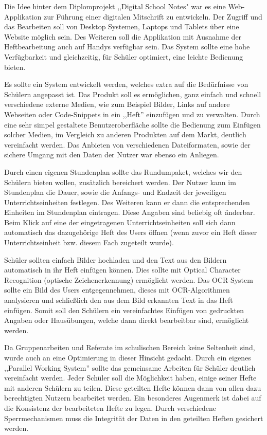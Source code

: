 Die Idee hinter dem Diplomprojekt ,,Digital School Notes" war es eine Web-Applikation zur Führung einer digitalen Mitschrift zu entwickeln. Der Zugriff und das Bearbeiten soll von Desktop Systemen, Laptops und Tablets über eine Website möglich sein. Des Weiteren soll die Applikation mit Ausnahme der Heftbearbeitung auch auf Handys verfügbar sein. Das System sollte eine hohe Verfügbarkeit und gleichzeitig, für Schüler optimiert, eine leichte Bedienung bieten. 

Es sollte ein System entwickelt werden, welches extra auf die Bedürfnisse von Schülern angepasst ist. Das Produkt soll es ermöglichen, ganz einfach und schnell verschiedene externe Medien, wie zum Beispiel Bilder, Links auf andere Webseiten oder Code-Snippets in ein ,,Heft'' einzufügen und zu verwalten. Durch eine sehr simpel gestaltete Benutzeroberfläche sollte die Bedienung zum Einfügen solcher Medien, im Vergleich zu anderen Produkten auf dem Markt, deutlich vereinfacht werden. Das Anbieten von verschiedenen Dateiformaten, sowie der sichere Umgang mit den Daten der Nutzer war ebenso ein Anliegen.

Durch einen eigenen Stundenplan sollte das Rundumpaket, welches wir den Schülern bieten wollen, zusätzlich bereichert werden. Der Nutzer kann im Stundenplan die Dauer, sowie die Anfangs- und Endzeit der jeweiligen Unterrichtseinheiten festlegen. Des Weiteren kann er dann die entsprechenden Einheiten im Stundenplan eintragen. Diese Angaben sind beliebig oft änderbar. Beim Klick auf eine der eingetragenen Unterrichtseinheiten soll sich dann automatisch das dazugehörige Heft des Users öffnen (wenn zuvor ein Heft dieser Unterrichtseinheit bzw. diesem Fach zugeteilt wurde).

Schüler sollten einfach Bilder hochladen und den Text aus den Bildern automatisch in ihr Heft einfügen können. Dies sollte mit Optical Character Recognition (optische Zeichenerkennung) ermöglicht werden. Das OCR-System sollte ein Bild des Users entgegennehmen, dieses mit OCR-Algorithmen analysieren und schließlich den aus dem Bild erkannten Text in das Heft einfügen. Somit soll den Schülern ein vereinfachtes Einfügen von gedruckten Angaben oder Hausübungen, welche dann direkt bearbeitbar sind, ermöglicht werden.

Da Gruppenarbeiten und Referate im schulischen Bereich keine Seltenheit sind, wurde auch an eine Optimierung in dieser Hinsicht gedacht. Durch ein eigenes ,,Parallel Working System'' sollte das gemeinsame Arbeiten für Schüler deutlich vereinfacht werden. Jeder Schüler soll die Möglichkeit haben, einige seiner Hefte mit anderen Schülern zu teilen. Diese geteilten Hefte können dann von allen dazu berechtigten Nutzern bearbeitet werden. Ein besonderes Augenmerk ist dabei auf die Konsistenz der bearbeiteten Hefte zu legen. Durch verschiedene Sperrmechanismen muss die Integrität der Daten in den geteilten Heften gesichert werden.

